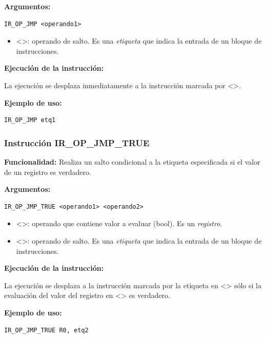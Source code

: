 \noindent
\textbf{Argumentos:}
\begin{verbatim}
IR_OP_JMP <operando1>
\end{verbatim}
\begin{itemize}
    \item <>: operando de salto. Es una \textit{etiqueta} que indica la entrada de un bloque de instrucciones.
\end{itemize}

\noindent
\textbf{Ejecución de la instrucción:}
\vspace{0.3cm}

\noindent
La ejecución se desplaza inmediatamente a la instrucción marcada por <>.
\vspace{0.3cm}

\noindent
\textbf{Ejemplo de uso:}
\begin{verbatim}
IR_OP_JMP etq1
\end{verbatim}

\subsubsection{Instrucción IR\_OP\_JMP\_TRUE}\label{subsubsec:IR_OP_JMP_TRUE}
\noindent
\textbf{Funcionalidad:} Realiza un salto condicional a la etiqueta especificada si el valor de un registro es verdadero.

\noindent
\textbf{Argumentos:}
\begin{verbatim}
IR_OP_JMP_TRUE <operando1> <operando2>
\end{verbatim}
\begin{itemize}
    \item <>: operando que contiene valor a evaluar (bool). Es un \textit{registro}.
    \item <>: operando de salto. Es una \textit{etiqueta} que indica la entrada de un bloque de instrucciones.
\end{itemize}

\noindent
\textbf{Ejecución de la instrucción:}
\vspace{0.3cm}

\noindent
La ejecución se desplaza a la instrucción marcada por la etiqueta en <> sólo si la evaluación del valor del registro en <> es verdadero.
\vspace{0.3cm}

\noindent
\textbf{Ejemplo de uso:}
\begin{verbatim}
IR_OP_JMP_TRUE R0, etq2
\end{verbatim}

